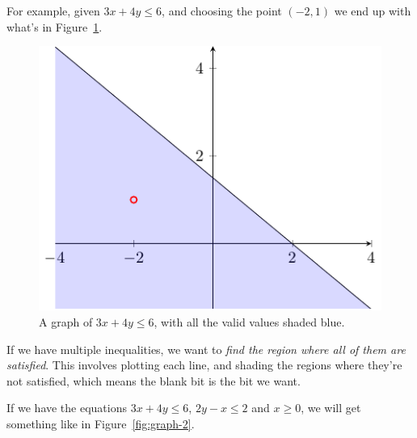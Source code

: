 For example, given $3x + 4y \leq 6$, and choosing the point $(-2,1)$ we end up
with what's in Figure~\ref{fig:graph-1}.

\begin{figure}[h]
  \centering
  \includegraphics{diagrams/graph1}
  \caption{A graph of $3x + 4y \leq 6$, with all the valid values shaded blue.}
  \label{fig:graph-1}
\end{figure}

If we have multiple inequalities, we want to \textit{find the region where all
of them are satisfied}. This involves plotting each line, and shading the
regions where they're not satisfied, which means the blank bit is the bit we
want.

If we have the equations $3x + 4y \leq 6$, $2y - x \leq 2$ and $x \geq 0$, we
will get something like in Figure~\ref{fig:graph-2}.

